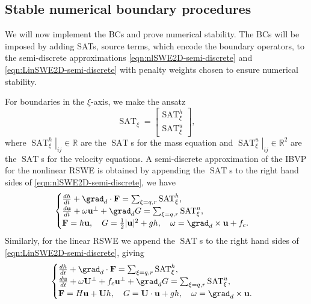 \documentclass{article}
\numberwithin{equation}{section}
\theoremstyle{definition}
\begin{document}
\subsection{Stable numerical boundary procedures}
We will now implement the BCs and prove numerical stability. The BCs will be imposed by adding SATs, source terms, which encode the boundary operators, to the semi-discrete approximations \eqref{eqn:nlSWE2D-semi-discrete} and  \eqref{eqn:LinSWE2D-semi-discrete} with penalty weights chosen to ensure numerical stability.

For boundaries in the $\xi$-axis, we make the ansatz 
$$
\operatorname{SAT}_\xi = 
\begin{bmatrix}
    \operatorname{SAT}^{h}_\xi\\
    \operatorname{SAT}^u_\xi
\end{bmatrix},
$$
where $ \left.\operatorname{SAT}^{h}_\xi\right|_{ij} \in \mathbb{R}$ are the $\operatorname{SAT}$s for the mass equation and  $ \left.\operatorname{SAT}^{u}_\xi\right|_{ij} \in \mathbb{R}^2$ are the $\operatorname{SAT}$s for the velocity equations. A semi-discrete approximation of the IBVP for the nonlinear RSWE is obtained by appending the $\operatorname{SAT}$s to the right hand sides of \eqref{eqn:nlSWE2D-semi-discrete}, we have 
\begin{equation}\label{eqn:nlSWE2D-semi-discrete-SAT}
    \begin{cases}
    \frac{d h}{d t } + \grad_d\cdot{\mathbf{F}} = \sum_{\xi = q, r}\operatorname{SAT}^{h}_\xi, \\
    \frac{d \mathbf{u}}{d t} + \omega \mathbf{u}^\perp +  \grad_d{G} = \sum_{\xi = q, r}\operatorname{SAT}^u_\xi,\\
    \mathbf{F}=h\mathbf{u}, \quad G = \frac{{1 }}{{2}}|\mathbf{u}|^2 +gh, \quad \omega = \grad_d\times{\mathbf{u}} + f_c.\end{cases}
\end{equation}
Similarly, for the linear RSWE we append the $\operatorname{SAT}$s to the right hand sides of \eqref{eqn:LinSWE2D-semi-discrete}, giving
\begin{equation}\label{eqn:LinSWE2D-semi-discrete-SAT}
    \begin{cases}
    \frac{d h}{d t } + \grad_d\cdot{\mathbf{F}} = \sum_{\xi = q, r}\operatorname{SAT}^{h}_\xi, \\
    \frac{d \mathbf{u}}{d t} + \omega \mathbf{U}^\perp + f_c \mathbf{u}^\perp + \grad_d{G} = \sum_{\xi = q, r}\operatorname{SAT}^{u}_\xi,\\
     \mathbf{F}= H\mathbf{u} + \mathbf{U}h, \quad G = \mathbf{U}\cdot\mathbf{u} +gh, \quad\omega =  \grad_d\times{\mathbf{u}}.
    \end{cases}
\end{equation}
\end{document}

